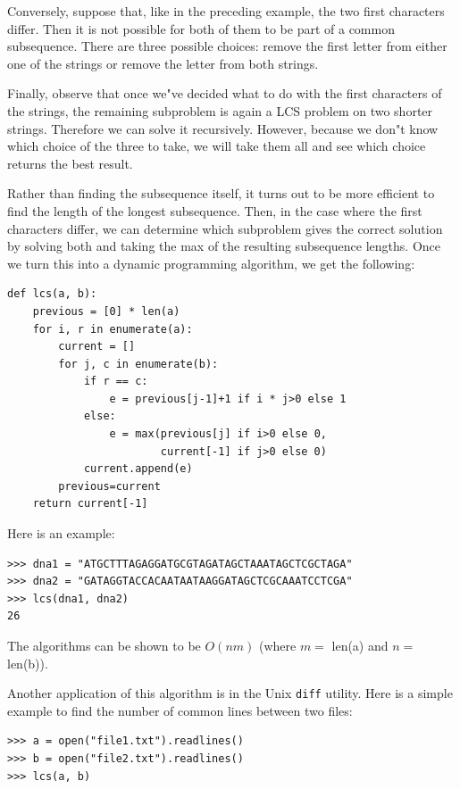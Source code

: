 \documentclass[justified, sixbynine]{tufte-book}
\def\ft{\small\tt}
\theoremstyle{plain}%
\newtheorem * {corollary}{Corollary}
\theoremstyle{definition}
\theoremstyle{remark}
\newtheorem * {remark}{Remark}
\newtheorem * {note}{Note}
\begin{document}
\begin{fullwidth}
Conversely, suppose that, like in the preceding example, the two first
characters differ. Then it is not possible for both of them to be part of a
common subsequence.  There are three possible choices: remove the first letter from
either one of the strings or remove the letter from both strings.

Finally, observe that once we"ve decided what to do with the first
characters of the strings, the remaining subproblem is again a LCS problem on two shorter strings. Therefore we can solve
it recursively. However, because we don"t know which choice of the three to take, 
we will take them all and see which choice returns the best result.

Rather than finding the subsequence itself, it turns out to be more
efficient to find the length of the longest subsequence. Then, in
the case where the first characters differ, we can determine which
subproblem gives the correct solution by solving both and taking the max of
the resulting subsequence lengths. Once we turn this into a dynamic
programming algorithm, we get the following:

\begin{lstlisting}[caption={in file: {\ft nlib.py}}]
def lcs(a, b):
    previous = [0] * len(a)
    for i, r in enumerate(a):
        current = []
        for j, c in enumerate(b):
            if r == c:
                e = previous[j-1]+1 if i * j>0 else 1
            else:
                e = max(previous[j] if i>0 else 0, 
                        current[-1] if j>0 else 0)
            current.append(e)
        previous=current
    return current[-1]
\end{lstlisting}

Here is an example:

\begin{lstlisting}[caption={in file: {\ft nlib.py}}]
>>> dna1 = "ATGCTTTAGAGGATGCGTAGATAGCTAAATAGCTCGCTAGA"
>>> dna2 = "GATAGGTACCACAATAATAAGGATAGCTCGCAAATCCTCGA"
>>> lcs(dna1, dna2)
26
\end{lstlisting}

The algorithms can be shown to be $O(nm)$ (where $m=$ len(a) and $n=$ len(b)).

Another application of this algorithm is in the Unix {\ft diff} utility. Here is a simple example to find the number of common lines between two files:

\begin{lstlisting}
>>> a = open("file1.txt").readlines()
>>> b = open("file2.txt").readlines()
>>> lcs(a, b)
\end{lstlisting}


\end{fullwidth}
\end{document}

